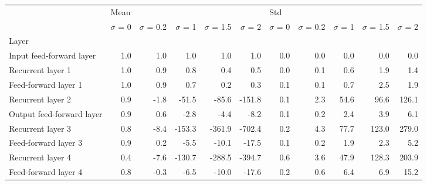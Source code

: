 \begin{tabular}{lrrrrrrrrrr}
\toprule
{} & \multicolumn{5}{l}{Mean} & \multicolumn{5}{l}{Std} \\
{} & $\sigma$  = 0 & $\sigma$  = 0.2 & $\sigma$  = 1 & $\sigma$  = 1.5 & $\sigma$  = 2 & $\sigma$  = 0 & $\sigma$  = 0.2 & $\sigma$  = 1 & $\sigma$  = 1.5 & $\sigma$  = 2 \\
Layer                     &               &                 &               &                 &               &               &                 &               &                 &               \\
\midrule
Input feed-forward layer  &           1.0 &             1.0 &           1.0 &             1.0 &           1.0 &           0.0 &             0.0 &           0.0 &             0.0 &           0.0 \\
Recurrent layer 1         &           1.0 &             0.9 &           0.8 &             0.4 &           0.5 &           0.0 &             0.1 &           0.6 &             1.9 &           1.4 \\
Feed-forward layer 1      &           1.0 &             0.9 &           0.7 &             0.2 &           0.3 &           0.1 &             0.1 &           0.7 &             2.5 &           1.9 \\
Recurrent layer 2         &           0.9 &            -1.8 &         -51.5 &           -85.6 &        -151.8 &           0.1 &             2.3 &          54.6 &            96.6 &         126.1 \\
Output feed-forward layer &           0.9 &             0.6 &          -2.8 &            -4.4 &          -8.2 &           0.1 &             0.2 &           2.4 &             3.9 &           6.1 \\
Recurrent layer 3         &           0.8 &            -8.4 &        -153.3 &          -361.9 &        -702.4 &           0.2 &             4.3 &          77.7 &           123.0 &         279.0 \\
Feed-forward layer 3      &           0.9 &             0.2 &          -5.5 &           -10.1 &         -17.5 &           0.1 &             0.2 &           1.9 &             2.3 &           5.2 \\
Recurrent layer 4         &           0.4 &            -7.6 &        -130.7 &          -288.5 &        -394.7 &           0.6 &             3.6 &          47.9 &           128.3 &         203.9 \\
Feed-forward layer 4      &           0.8 &            -0.3 &          -6.5 &           -10.0 &         -17.6 &           0.2 &             0.6 &           6.4 &             6.9 &          15.2 \\
\bottomrule
\end{tabular}
